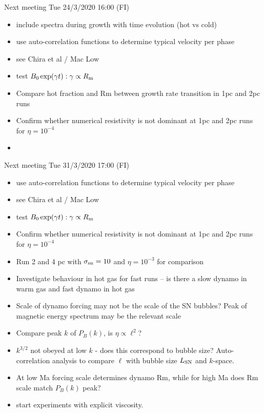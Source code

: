 \documentclass[iop,apj,numberedappendix,twocolappendix]{emulateapj}
\begin{document}
Next meeting Tue 24/3/2020 16:00 (FI)
\begin{itemize} 
\item include spectra during growth with time evolution (hot vs cold)
\item use auto-correlation functions to determine typical velocity per phase
\item see Chira et al / Mac Low
\item test $B_0\exp(\gamma t): \gamma\propto R_{\rm m}$
\item Compare hot fraction and Rm between growth rate transition in 1pc and 2pc runs
\item Confirm whether numerical resistivity is not dominant at 1pc and 2pc runs for $\eta=10^{-4}$
\item 
\end{itemize} 

Next meeting Tue 31/3/2020 17:00 (FI)
\begin{itemize} 
\item use auto-correlation functions to determine typical velocity per phase
\item see Chira et al / Mac Low
\item test $B_0\exp(\gamma t): \gamma\propto R_{\rm m}$
\item Confirm whether numerical resistivity is not dominant at 1pc and 2pc runs for $\eta=10^{-4}$
\item Run 2 and 4 pc with $\sigma_{\rm sn}=10$ and $\eta=10^{-3}$ for comparison
\item Investigate behaviour in hot gas for fast runs -- is there a slow
dynamo in warm gas and fast dynamo in hot gas
\item Scale of dynamo forcing may not be the scale of the SN bubbles? Peak of magnetic energy spectrum may be the relevant scale
\item Compare peak $k$ of $P_B(k)$, is $\eta\propto\ell^2$?
\item $k^{3/2}$ not obeyed at low $k$ - does this correspond to bubble size? Auto-correlation analysis to compare $\ell$ with bubble size $L_{\rm SN}$ and $k$-space.
\item At low Ma forcing scale determines dynamo Rm, while for high Ma does
Rm scale match $P_B(k)$ peak?
\item start experiments with explicit viscosity.
\end{itemize} 
\end{document}
